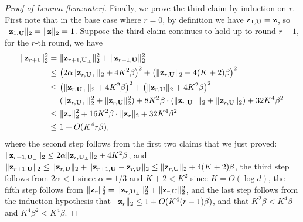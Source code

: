 \begin{proof}[Proof of Lemma \ref{lem:outer}]
Finally, we prove the third claim by induction on $r$. First note that in the base case where $r=0$, by definition we have $\mathbf{z}_{1, \mathbf{U}} = \mathbf{z}$, so $\|\mathbf{z}_{1, \mathbf{U}}\|_2 = \|\mathbf{z}\|_2 = 1$. Suppose the third claim continues to hold up to round $r-1$, for the $r$-th round, we have
\begin{align*}
\|\mathbf{z}_{r+1}\|_2^2 = &~ \|\mathbf{z}_{r+1, \mathbf{U}_\perp}\|_2^2 + \|\mathbf{z}_{r+1, \mathbf{U}}\|_2^2 \\
\leq &~ \big(2\alpha \|\mathbf{z}_{r, \mathbf{U}_\perp}\|_2 + 4K^2\beta \big)^2 + \big(\|\mathbf{z}_{r, \mathbf{U}}\|_2 + 4(K+2)\beta \big)^2 \\
\leq &~ \big(\|\mathbf{z}_{r, \mathbf{U}_\perp}\|_2 + 4K^2\beta \big)^2 + \big(\|\mathbf{z}_{r, \mathbf{U}}\|_2 + 4 K^2 \beta \big)^2 \\
= &~ (\|\mathbf{z}_{r, \mathbf{U}_\perp}\|_2^2 + \|\mathbf{z}_{r, \mathbf{U}}\|_2^2) + 8 K^2 \beta \cdot (\|\mathbf{z}_{r, \mathbf{U}_\perp}\|_2 + \|\mathbf{z}_{r, \mathbf{U}}\|_2) + 32 K^4 \beta^2 \\
\leq &~ \|\mathbf{z}_r\|_2^2 + 16 K^2 \beta \cdot \|\mathbf{z}_r\|_2 + 32 K^4 \beta^2 \\
\leq &~ 1 + O(K^4 r \beta),
\end{align*}
where the second step follows from the first two claims that we just proved: $\|\mathbf{z}_{r+1, \mathbf{U}_\perp}\|_2 \leq 2\alpha \|\mathbf{z}_{r, \mathbf{U}_\perp}\|_2 + 4K^2\beta$, and $\|\mathbf{z}_{r+1, \mathbf{U}}\|_2 \leq \|\mathbf{z}_{r, \mathbf{U}}\|_2 + \|\mathbf{z}_{r+1, \mathbf{U}} - \mathbf{z}_{r, \mathbf{U}}\|_2 \leq \|\mathbf{z}_{r, \mathbf{U}}\|_2 + 4(K+2)\beta$, the third step follows from $2 \alpha < 1$ since $\alpha = 1/3$ and $K+2 < K^2$ since $K = O(\log d)$, the fifth step follows from $\|\mathbf{z}_r\|_2^2 = \|\mathbf{z}_{r, \mathbf{U}_\perp}\|_2^2 + \|\mathbf{z}_{r, \mathbf{U}}\|_2^2$, and the last step follows from the induction hypothesis that $\|\mathbf{z}_r\|_2 \leq 1 + O(K^4 (r-1) \beta)$, and that $K^2 \beta < K^4 \beta$ and $K^4 \beta^2 < K^4 \beta$.
\end{proof}



